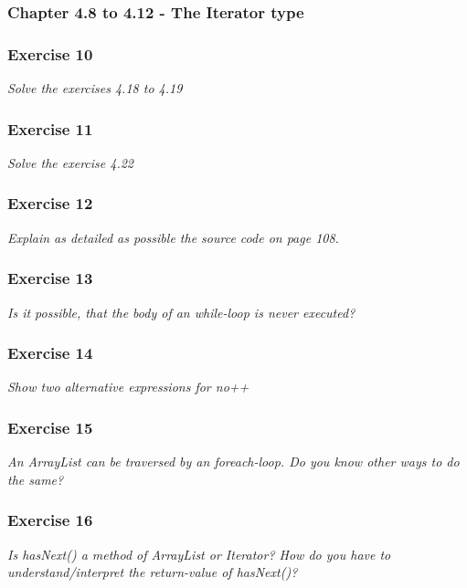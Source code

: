 \subsubsection{Chapter 4.8 to 4.12 - The Iterator type}

\subsubsection*{Exercise 10}
\textit{Solve the exercises 4.18 to 4.19}\\

\subsubsection*{Exercise 11}
\textit{Solve the exercise 4.22}\\

\subsubsection*{Exercise 12}
\textit{Explain as detailed as possible the source code on page 108.}\\

\subsubsection*{Exercise 13}
\textit{Is it possible, that the body of an while-loop is never executed?}\\

\subsubsection*{Exercise 14}
\textit{Show two alternative expressions for no++}\\

\subsubsection*{Exercise 15}
\textit{An ArrayList can be traversed by an foreach-loop. Do you know other
ways to do the same?}\\

\subsubsection*{Exercise 16}
\textit{Is hasNext() a method of ArrayList or Iterator? How do you have to 
understand/interpret the return-value of hasNext()?}\\

